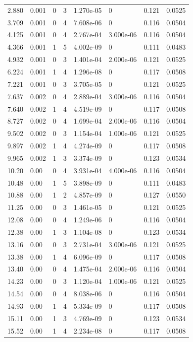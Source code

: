 \documentclass[preview]{standalone}
\begin{document}
{{\begin{tabular}{L{1.2cm}C{1.2cm} C{0.3cm}C{0.5cm} C{1.4cm}C{1.4cm} C{1.4cm}C{1.4cm}}
  2.880  &  0.001  & 0     &  3 &  1.270e-05  & 0  & 0.121 &  0.0525   \\ 
  3.709  &  0.001  & 0     &  4 &  7.608e-06  & 0  & 0.116 &  0.0504   \\ 
  4.125  &  0.001  & 0     &  4 &  2.767e-04  & 3.000e-06  & 0.116 &  0.0504   \\ 
  4.366  &  0.001  & 1     &  5 &  4.002e-09  & 0  & 0.111 &  0.0483   \\ 
  4.932  &  0.001  & 0     &  3 &  1.401e-04  & 2.000e-06  & 0.121 &  0.0525   \\ 
  6.224  &  0.001  & 1     &  4 &  1.296e-08  & 0  & 0.117 &  0.0508   \\ 
  7.221  &  0.001  & 0     &  3 &  3.705e-05  & 0  & 0.121 &  0.0525   \\ 
  7.637  &  0.002  & 0     &  4 &  2.889e-04  & 3.000e-06  & 0.116 &  0.0504   \\ 
  7.640  &  0.002  & 1     &  4 &  4.519e-09  & 0  & 0.117 &  0.0508   \\ 
  8.727  &  0.002  & 0     &  4 &  1.699e-04  & 2.000e-06  & 0.116 &  0.0504   \\ 
  9.502  &  0.002  & 0     &  3 &  1.154e-04  & 1.000e-06  & 0.121 &  0.0525   \\ 
  9.897  &  0.002  & 1     &  4 &  4.274e-09  & 0  & 0.117 &  0.0508   \\ 
  9.965  &  0.002  & 1     &  3 &  3.374e-09  & 0  & 0.123 &  0.0534   \\ 
  10.20  &  0.00  & 0     &  4 &  3.931e-04  & 4.000e-06  & 0.116 &  0.0504   \\ 
  10.48  &  0.00  & 1     &  5 &  3.898e-09  & 0  & 0.111 &  0.0483   \\ 
  10.88  &  0.00  & 1     &  2 &  4.857e-09  & 0  & 0.127 &  0.0550   \\ 
  11.25  &  0.00  & 0     &  3 &  1.461e-05  & 0  & 0.121 &  0.0525   \\ 
  12.08  &  0.00  & 0     &  4 &  1.249e-06  & 0  & 0.116 &  0.0504   \\ 
  12.38  &  0.00  & 1     &  3 &  1.104e-08  & 0  & 0.123 &  0.0534   \\ 
  13.16  &  0.00  & 0     &  3 &  2.731e-04  & 3.000e-06  & 0.121 &  0.0525   \\ 
  13.38  &  0.00  & 1     &  4 &  6.096e-09  & 0  & 0.117 &  0.0508   \\ 
  13.40  &  0.00  & 0     &  4 &  1.475e-04  & 2.000e-06  & 0.116 &  0.0504   \\ 
  14.23  &  0.00  & 0     &  3 &  1.120e-04  & 1.000e-06  & 0.121 &  0.0525   \\ 
  14.54  &  0.00  & 0     &  4 &  8.038e-06  & 0  & 0.116 &  0.0504   \\ 
  14.93  &  0.00  & 1     &  4 &  5.334e-09  & 0  & 0.117 &  0.0508   \\ 
  15.11  &  0.00  & 1     &  3 &  4.769e-09  & 0  & 0.123 &  0.0534   \\ 
  15.52  &  0.00  & 1     &  4 &  2.234e-08  & 0  & 0.117 &  0.0508   \\ 
\hline 
\end{tabular} 

}}
\end{document}
